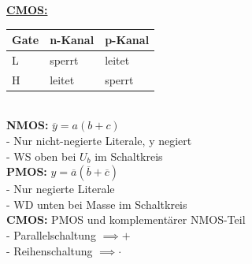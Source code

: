 \documentclass[8pt]{extarticle}
\begin{document}
\begin{minipage}{0.33\textwidth}
\underline{\textbf{CMOS:}}\\
\begin{tabular}{l|ll}
    Gate & n-Kanal & p-Kanal \\
    \hline
    L & sperrt & leitet \\
    H & leitet & sperrt
\end{tabular}
\\
\textbf{NMOS:} $\overline{y} = a(b+c)$ \\
- Nur nicht-negierte Literale, y negiert \\
- WS oben bei $U_b$ im Schaltkreis\\
\textbf{PMOS:} $y = \overline{a}(\overline{b} + \overline{c})$ \\
- Nur negierte Literale \\
- WD unten bei Masse im Schaltkreis\\
\textbf{CMOS:} PMOS und komplementärer NMOS-Teil\\
- Parallelschaltung $\implies +$ \\
- Reihenschaltung \hspace{0.1mm} $\implies \mathbf{\cdot}$ \\

\end{minipage}
~~~~~~~
\end{document}
